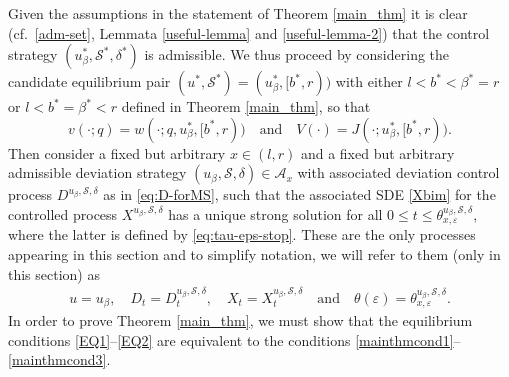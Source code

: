 \documentclass[11pt]{article} %
\numberwithin{komcounter}{section}
\renewcommand{\epsilon}{\varepsilon}
\begin{document}
Given the assumptions in the statement of Theorem \ref{main_thm} it is clear (cf.~\eqref{adm-set}, Lemmata \ref{useful-lemma} and \ref{useful-lemma-2}) that the control strategy $(u_\beta^*,\mathcal{S}^*,\delta^*)$ is admissible.
We thus proceed by considering the candidate equilibrium pair $(u^*,\mathcal{S}^*) = (u_\beta^*, [b^*,r))$ with either $l<b^*<\beta^*=r$ or $l<b^*=\beta^*<r$ defined in Theorem \ref{main_thm}, so that
$$
v(\cdot;q) = w(\cdot;q,u_\beta^*,[b^*,r)) 
\quad \text{and} \quad 
V(\cdot) = J(\cdot;u_\beta^*,[b^*,r)).
$$
Then consider a fixed but arbitrary $x \in (l,r)$ and a fixed but arbitrary admissible deviation strategy  $({u_\beta,\mathcal{S},\delta}) \in \mathcal{A}_x$ with associated deviation control process $D^{u_\beta,\mathcal{S},\delta}$ as in \eqref{eq:D-forMS}, 
such that the associated SDE \eqref{Xbim} for the controlled process $X^{u_\beta,\mathcal{S},\delta}$ has a unique strong solution for all $0 \leq t \leq \theta^{u_\beta,\mathcal{S},\delta}_{x,\epsilon}$, where the latter is defined by \eqref{eq:tau-eps-stop}. These are the only processes appearing in this section and to simplify notation, we will refer to them (only in this section) as  
\begin{align}\label{q2rq13ra}
u = u_\beta, 
\quad 
D_t = D_t^{u_\beta,\mathcal{S},\delta}, 
\quad 
X_t = X_t^{u_\beta,\mathcal{S},\delta}
\quad \text{and} \quad 
\theta(\epsilon) = \theta^{u_\beta,\mathcal{S},\delta}_{x,\epsilon}.
\end{align}
In order to prove Theorem \ref{main_thm}, we must show that the equilibrium conditions \eqref{EQ1}--\eqref{EQ2} are equivalent to the conditions \eqref{mainthmcond1}--\eqref{mainthmcond3}. 
\end{document}
